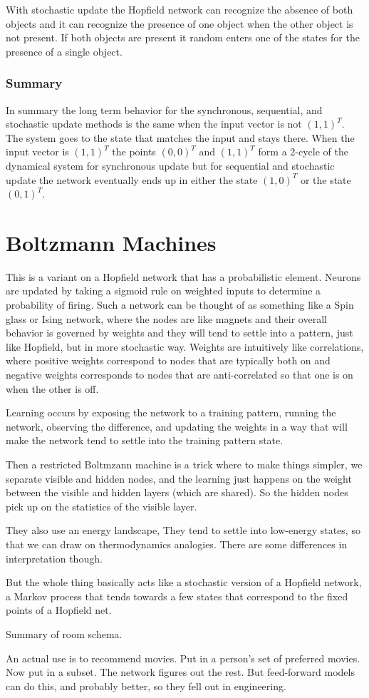   With stochastic update the Hopfield network can recognize the absence of
both objects and it can recognize the presence of one object when the other
object is not present.  If both objects are present it random enters one of the
states for the presence of a single object.

\subsubsection{Summary}

   In summary the long term behavior for the synchronous, sequential, and 
stochastic update methods is the same when the input vector is not $(1,1)^T$.  
The system goes to the state that matches the input and stays there.  When the 
input vector is $(1,1)^T$ the points $(0,0)^T$ and $(1,1)^T$ form a 2-cycle of 
the dynamical system for synchronous update but for sequential and stochastic 
update the network eventually ends up in either the state $(1,0)^T$ or the 
state $(0,1)^T$.

\section{Boltzmann Machines}

This is a variant on a Hopfield network that has a probabilistic element. Neurons are updated by taking a sigmoid rule on weighted inputs to determine a probability of firing.  Such a network can be thought of as something like a Spin glass or Ising network, where the nodes are like magnets and their overall behavior is governed by weights and they will tend to settle into a pattern, just like Hopfield, but in more stochastic way.  Weights are intuitively like correlations, where positive weights correspond to nodes that are typically both on and negative weights corresponds to nodes that are anti-correlated so that one is on when the other is off.

Learning occurs by exposing the network to a training pattern, running the network, observing the difference, and updating the weights in a way that will make the network tend to settle into the training pattern state.

Then a restricted Boltmzann machine is a trick where to make things simpler, we separate visible and hidden nodes, and the learning just happens on the weight between the visible and hidden layers (which are shared).  So the hidden nodes pick up on the statistics of the visible layer.

They also use an energy landscape, They tend to settle into low-energy states, so that we can draw on thermodynamics analogies. There are some differences in interpretation though.

But the whole thing basically acts like a stochastic version of a Hopfield network, a Markov process that tends towards a few states that correspond to the fixed points of a Hopfield net.

Summary of room schema.

An actual use is to recommend movies. Put in a person's set of preferred movies. Now put in a subset. The network figures out the rest. But feed-forward models can do this, and probably better, so they fell out in engineering.
